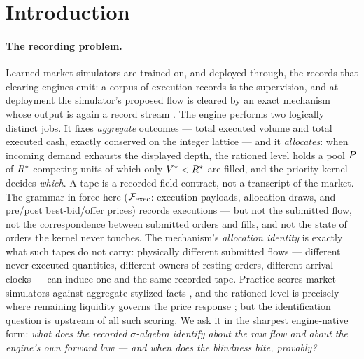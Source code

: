 \section{Introduction}
\label{sec:intro}

\paragraph{The recording problem.}
Learned market simulators are trained on, and deployed through, the records
that clearing engines emit: a corpus of execution records is the supervision,
and at deployment the simulator's proposed flow is cleared by an exact
mechanism whose output is again a record stream
\citep{nagy2023,mars2024}. The engine performs two logically distinct jobs.
It fixes \emph{aggregate} outcomes --- total executed volume and total
executed cash, exactly conserved on the integer lattice --- and it
\emph{allocates}: when incoming demand exhausts the displayed depth, the
rationed level holds a pool $P$ of $R^{*}$ competing units of which
only $V^{*} < R^{*}$ are filled, and the priority kernel decides
\emph{which}. A tape is a recorded-field contract, not a transcript of the
market. The grammar in force here ($\mathcal{F}_{\mathrm{exec}}$: execution payloads, allocation
draws, and pre/post best-bid/offer prices) records executions --- but not the
submitted flow, not the correspondence between submitted orders and fills,
and not the state of orders the kernel never touches. The mechanism's
\emph{allocation identity} is exactly what such tapes do not carry:
physically different submitted flows --- different never-executed quantities,
different owners of resting orders, different arrival clocks --- can induce
one and the same recorded tape. Practice scores market simulators against
aggregate stylized facts \citep{cont2001}, and the rationed level is
precisely where remaining liquidity governs the price response
\citep{toth2011}; but the identification question is upstream of all such
scoring. We ask it in the sharpest engine-native form: \emph{what does the
recorded $\sigma$-algebra identify about the raw flow and about the engine's
own forward law --- and when does the blindness bite, provably?}

